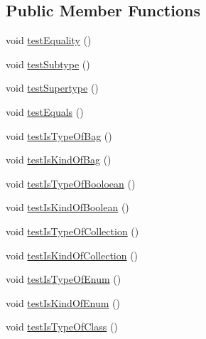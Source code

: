\subsection*{Public Member Functions}
\begin{DoxyCompactItemize}
\item 
void \hyperlink{classorg_1_1tzi_1_1use_1_1uml_1_1ocl_1_1type_1_1_type_test_a57a3e31be85977f6701106148d5a1c0f}{test\-Equality} ()
\item 
void \hyperlink{classorg_1_1tzi_1_1use_1_1uml_1_1ocl_1_1type_1_1_type_test_a9ede66afd5713ffe64eeaf4be26c8a7b}{test\-Subtype} ()
\item 
void \hyperlink{classorg_1_1tzi_1_1use_1_1uml_1_1ocl_1_1type_1_1_type_test_aa39436afcc93bfaae7d83aadeea7d8b2}{test\-Supertype} ()
\item 
void \hyperlink{classorg_1_1tzi_1_1use_1_1uml_1_1ocl_1_1type_1_1_type_test_a137b66ae861d88aee20c5a255f11a42c}{test\-Equals} ()
\item 
void \hyperlink{classorg_1_1tzi_1_1use_1_1uml_1_1ocl_1_1type_1_1_type_test_a340e0f9c88940af5352e67e95d5fd8c8}{test\-Is\-Type\-Of\-Bag} ()
\item 
void \hyperlink{classorg_1_1tzi_1_1use_1_1uml_1_1ocl_1_1type_1_1_type_test_a9d981fe9f542dad2dfc75a0adaf0b48f}{test\-Is\-Kind\-Of\-Bag} ()
\item 
void \hyperlink{classorg_1_1tzi_1_1use_1_1uml_1_1ocl_1_1type_1_1_type_test_a82dbac1d95fb2d3b4faa494ea55c8027}{test\-Is\-Type\-Of\-Booloean} ()
\item 
void \hyperlink{classorg_1_1tzi_1_1use_1_1uml_1_1ocl_1_1type_1_1_type_test_aea56de9797de429aa1d3ca658096bcb5}{test\-Is\-Kind\-Of\-Boolean} ()
\item 
void \hyperlink{classorg_1_1tzi_1_1use_1_1uml_1_1ocl_1_1type_1_1_type_test_a78107dcac5a705db368f3e20b3e2fec6}{test\-Is\-Type\-Of\-Collection} ()
\item 
void \hyperlink{classorg_1_1tzi_1_1use_1_1uml_1_1ocl_1_1type_1_1_type_test_a9875f2da714ad83a9a8adc6e55ca4071}{test\-Is\-Kind\-Of\-Collection} ()
\item 
void \hyperlink{classorg_1_1tzi_1_1use_1_1uml_1_1ocl_1_1type_1_1_type_test_a945dbfdda51d9047a08bdd1c45716eb6}{test\-Is\-Type\-Of\-Enum} ()
\item 
void \hyperlink{classorg_1_1tzi_1_1use_1_1uml_1_1ocl_1_1type_1_1_type_test_a1b9e1ec14dd8296b6dd169f5a12ae9ad}{test\-Is\-Kind\-Of\-Enum} ()
\item 
void \hyperlink{classorg_1_1tzi_1_1use_1_1uml_1_1ocl_1_1type_1_1_type_test_ad87cfc195b18a0e4aa2199ed487c31a2}{test\-Is\-Type\-Of\-Class} ()

\end{DoxyCompactItemize}

